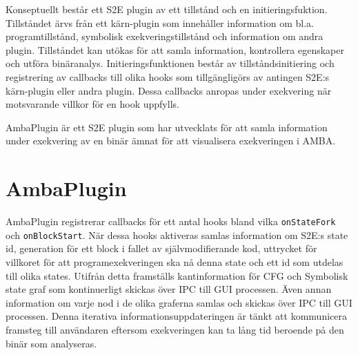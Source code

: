 Konseptuellt består ett S2E plugin av ett tillstånd och en initieringsfuktion. Tillståndet ärvs från ett kärn-plugin som innehåller information om bl.a. programtillstånd, symbolisk exekveringstillstånd och information om andra plugin. Tillståndet kan utökas för att samla information, kontrollera egenskaper och utföra binäranalys. Initieringsfunktionen består av tillståndsinitiering och registrering av callbacks till olika hooks som tillgängligörs av antingen S2E:s kärn-plugin eller andra plugin. Dessa callbacks anropas under exekvering när motsvarande villkor för en hook uppfylls.

AmbaPlugin är ett S2E plugin som har utvecklats för att samla information under exekvering av en binär ämnat för att visualisera exekveringen i AMBA.

\section{AmbaPlugin}
AmbaPlugin registrerar callbacks för ett antal hooks bland vilka \texttt{onStateFork} och \texttt{onBlockStart}.
När dessa hooks aktiveras samlas information om S2E:s state id, generation för ett block i fallet av självmodifierande kod, uttrycket för villkoret för att programexekveringen ska nå denna state och ett id som utdelas till olika states. Utifrån detta framställs kantinformation för CFG och Symbolisk state graf som kontinuerligt skickas över IPC till GUI processen. Även annan information om varje nod i de olika graferna samlas och skickas över IPC till GUI processen. Denna iterativa informationsuppdateringen är tänkt att kommunicera framsteg till användaren eftersom exekveringen kan ta lång tid beroende på den binär som analyseras.


